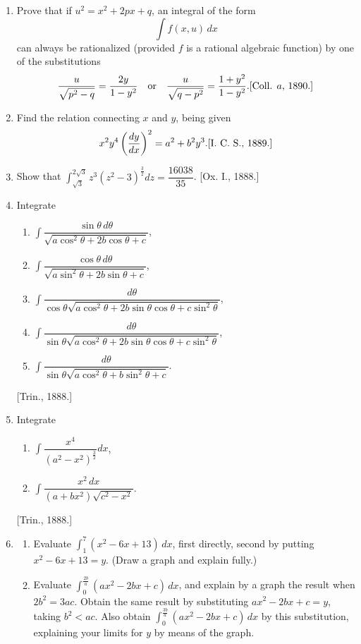 \documentclass[11pt, a4paper]{article}
\newcommand{\source}[1]{\hfill\textnormal{[#1]}}
\begin{document}
\begin{enumerate}[leftmargin=2em]
\item Prove that if $u^2=x^2+2px+q$, an integral of the form
\[
\int f(x,u)\,dx
\]
can always be rationalized (provided $f$ is a rational algebraic function) by one of the substitutions
\[
\dfrac{u}{\sqrt{p^2-q}}=\dfrac{2y}{1-y^2} \quad\text{or}\quad \dfrac{u}{\sqrt{q-p^2}}=\dfrac{1+y^2}{1-y^2}. \source{Coll. $a$, 1890.}
\]

\item Find the relation connecting $x$ and $y$, being given
\[
x^2y^4\left(\dfrac{dy}{dx}\right)^2=a^2+b^2y^3. \source{I. C. S., 1889.}
\]

\item Show that $\displaystyle\int_{\sqrt3}^{2\sqrt3} z^3(z^2-3)^{\frac32}dz=\dfrac{16038}{35}$. \source{Ox. I., 1888.}

\item Integrate
\begin{enumerate}[label=(\roman*)]
\item $\displaystyle\int \dfrac{\sin\theta\,d\theta}{\sqrt{a\cos^2\theta+2b\cos\theta+c}}$,
\item $\displaystyle\int \dfrac{\cos\theta\,d\theta}{\sqrt{a\sin^2\theta+2b\sin\theta+c}}$,
\item $\displaystyle\int \dfrac{d\theta}{\cos\theta\sqrt{a\cos^2\theta+2b\sin\theta\cos\theta+c\sin^2\theta}}$,
\item $\displaystyle\int \dfrac{d\theta}{\sin\theta\sqrt{a\cos^2\theta+2b\sin\theta\cos\theta+c\sin^2\theta}}$,
\item $\displaystyle\int \dfrac{d\theta}{\sin\theta\sqrt{a\cos^2\theta+b\sin^2\theta+c}}$.
\end{enumerate}
\source{Trin., 1888.}

\item Integrate
\begin{enumerate}[label=(\roman*)]
\item $\displaystyle\int \dfrac{x^4}{(a^2-x^2)^{\frac32}}dx$,
\item $\displaystyle\int \dfrac{x^2\,dx}{(a+bx^2)\sqrt{c^2-x^2}}$.
\end{enumerate}
\source{Trin., 1888.}

\item
\begin{enumerate}[label=(\alph*)]
\item Evaluate $\displaystyle\int_1^7 (x^2-6x+13)\,dx$, first directly, second by putting $x^2-6x+13=y$. (Draw a graph and explain fully.)
\item Evaluate $\displaystyle\int_0^{\frac{2b}{a}} (ax^2-2bx+c)\,dx$,
and explain by a graph the result when $2b^2=3ac$.
Obtain the same result by substituting
$ax^2-2bx+c=y$, taking $b^2<ac$.
Also obtain $\displaystyle\int_0^{\frac{3b}{a}} (ax^2-2bx+c)\,dx$ by this substitution, explaining your limits for $y$ by means of the graph.
\end{enumerate}


\end{enumerate}
\end{document}
